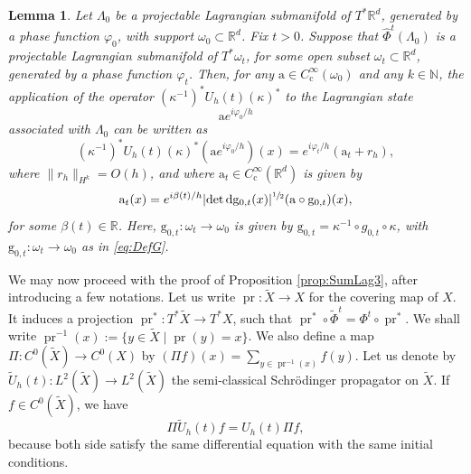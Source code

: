 \documentclass[JEP,XML,SOM,Unicode,published]{cedram}
\let\sep\mid
\newcommand{\rc}{\mathrm{c}}
\newcommand{\rd}{\,\mathrm{d}}
\theoremstyle{plain}
\newtheorem{lemma}[theorem]{Lemma}
\theoremstyle{definition}
\newcommand{\N}{\mathbb{N}}
\newcommand{\R}{\mathbb{R}}
\DeclareMathOperator{\pr}{pr}
\begin{document}
\begin{lemma}\label{lem:SchrodEucl}
Let $\Lambda_0$ be a projectable Lagrangian submanifold of $T^*\R^d$, generated by a phase function $\varphi_0$, with support $\omega_0\subset \R^d$. Fix $t>0$. Suppose that $\widehat{\Phi}^t(\Lambda_0)$ is a projectable Lagrangian submanifold of $T^*\omega_t$, for some open subset $\omega_t\subset\R^d$, generated by a phase function $\varphi_t$. Then, for any $\mathrm{a}\in C_\rc^\infty(\omega_0)$ and any $k\in \N$, the application of the operator $(\kappa^{-1})^* U_h(t)(\kappa)^*$ to the Lagrangian state
\begin{equation*}
\mathrm{a} e^{i\varphi_0/h}
\end{equation*}
associated with $\Lambda_0$ can be written as
\begin{equation*}
(\kappa^{-1})^* U_h(t)(\kappa)^*(\mathrm{a} e^{i\varphi_0/h})(x) = e^{i\varphi_t/h}(\mathrm{a}_t+ r_h),
\end{equation*}
where $\|r_h\|_{H^k}= O(h)$, and where $\mathrm{a}_t\in C_\rc^\infty(\R^d)$ is given by
\begin{equation}\label{eq:FormulaAmplitude}
\mathrm{a}_t(x)= e^{i\beta(t)/h} |{\det} \rd \mathrm{g}_{0,t}(x)|^{\sfrac{1}{2}} (\mathrm{a}\circ \mathrm{g}_{0,t})(x),
\end{equation}
for some $\beta(t)\in \R$. Here, $\mathrm{g}_{0,t} : \omega_t\to \omega_0$ is given by
$\mathrm{g}_{0,t} = \kappa^{-1} \circ g_{0,t} \circ \kappa$, with $\mathrm{g}_{0,t} :\omega_t\to \omega_0$
as in \eqref{eq:DefG}.
\end{lemma}

We may now proceed with the proof of Proposition \ref{prop:SumLag3}, after introducing a few notations. Let us write $\pr \!:\! \widetilde{X}\!\to\! X$ for the covering map of $X$. It induces a projection $\pr^* \!:\! T^*\widetilde{X}\!\to\! T^*X$, such that $\pr^*\circ \tilde{\Phi}^t\! =\! \Phi^t \circ \pr^*$. We shall write \hbox{$\pr^{-1}(x) \!:=\! \{y\!\in\! \widetilde{X}\sep \pr (y) \!=\! x\}$}. We also define a map $\Pi: C^0(\tilde{X}) \to C^0(X)$ by $(\Pi f)(x) = \sum_{y\in \pr^{-1}(x)} f(y)$.
Let us denote by $\tilde{U}_h(t) : L^2(\tilde{X})\to L^2(\tilde{X})$ the semi-classical Schrödinger propagator on $\tilde{X}$. If $f\in C^0(\tilde{X})$, we have
\begin{equation}\label{eq:PropagRevet}
\Pi \tilde{U}_h(t) f = U_h(t) \Pi f,
\end{equation}
because both side satisfy the same differential equation with the same initial conditions.
\end{document}
